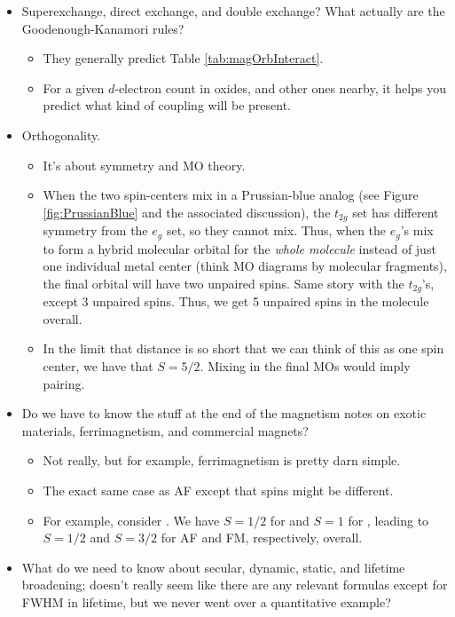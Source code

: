 \documentclass[../notes.tex]{subfiles}
\begin{document}
\begin{itemize}
\begin{itemize}
    \end{itemize}
    \item Superexchange, direct exchange, and double exchange? What actually are the Goodenough-Kanamori rules?
    \begin{itemize}
        \item They generally predict Table \ref{tab:magOrbInteract}.
        \item For a given $d$-electron count in oxides, and other ones nearby, it helps you predict what kind of coupling will be present.
    \end{itemize}
    \item Orthogonality.
    \begin{itemize}
        \item It's about symmetry and MO theory.
        \item When the two spin-centers mix in a Prussian-blue analog (see Figure \ref{fig:PrussianBlue} and the associated discussion), the $t_{2g}$ set has different symmetry from the $e_g$ set, so they cannot mix. Thus, when the $e_g$'s mix to form a hybrid molecular orbital for the \emph{whole molecule} instead of just one individual metal center (think MO diagrams by molecular fragments), the final orbital will have two unpaired spins. Same story with the $t_{2g}$'s, except 3 unpaired spins. Thus, we get 5 unpaired spins in the molecule overall.
        \item In the limit that distance is so short that we can think of this as one spin center, we have that $S=5/2$. Mixing in the final MOs would imply pairing.
    \end{itemize}
    \item Do we have to know the stuff at the end of the magnetism notes on exotic materials, ferrimagnetism, and commercial magnets?
    \begin{itemize}
        \item Not really, but for example, ferrimagnetism is pretty darn simple.
        \item The exact same case as AF except that spins might be different.
        \item For example, consider . We have $S=1/2$ for  and $S=1$ for , leading to $S=1/2$ and $S=3/2$ for AF and FM, respectively, overall.
    \end{itemize}
    \item What do we need to know about secular, dynamic, static, and lifetime broadening; doesn't really seem like there are any relevant formulas except for FWHM in lifetime, but we never went over a quantitative example?

\end{itemize}
\end{document}
